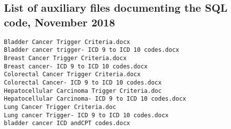 \documentclass{article}
\begin{document}
\subsection{List of auxiliary files documenting the SQL code, November 2018}

\begin{verbatim}
Bladder Cancer Trigger Criteria.docx
Bladder cancer trigger- ICD 9 to ICD 10 codes.docx
Breast Cancer Trigger Criteria.docx
Breast cancer- ICD 9 to ICD 10 codes.docx
Colorectal Cancer Trigger Criteria.docx
Colorectal Cancer- ICD 9 to ICD 10 codes.docx
Hepatocellular Carcinoma Trigger Criteria.doc
Hepatocellular Carcinoma- ICD 9 to ICD 10 codes.docx
Lung Cancer Trigger Criteria.doc
Lung cancer Trigger- ICD 9 to ICD 10 codes.docx
bladder cancer ICD andCPT codes.docx
\end{verbatim}
\end{document}
